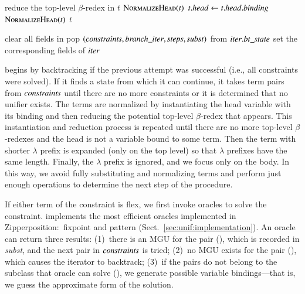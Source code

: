 \begin{algorithmic}[]
      \State reduce the top-level $\beta$-redex in $t$
      \State \Return $\textsc{NormalizeHead}(t)$
      \State $\mathit{t.head} \gets \mathit{t.head.binding}$
      \State \Return $\textsc{NormalizeHead}(t)$
    \Else{}
      \State \Return $t$
    \EndIf
  \EndFunction
  
  \vspace{\jot}
      \State clear all fields in 
      \State \Return {}
    \Else
    \State pop $(\mathit{constraints}, \mathit{branch\_iter}, \mathit{steps}, \mathit{subst})$ from $\mathit{iter.bt\_state}$
    \State set the corresponding fields of $\mathit{iter}$
    \State \Return {}
    \EndIf
  \EndFunction
  \vspace{\jot}
  
\end{algorithmic} 

 begins by backtracking if the previous attempt was successful (i.e., 
all constraints were solved). If it finds a state from which it can continue,
it takes term pairs from $\mathit{constraints}$ until
there are no more constraints or it is determined that no unifier exists. The terms
are normalized by instantiating the head variable with its binding and then
reducing the potential top-level $\beta$-redex that appears. This instantiation
and reduction process is repeated
until there are no more top-level $\beta$-redexes and the head is
not a variable bound to some term. Then the term with shorter
$\lambda$ prefix is expanded (only on the top level) so that $\lambda$ prefixes have the
same length. Finally, the $\lambda$ prefix is ignored, and we
focus only on the body. In this way, we avoid fully substituting
and normalizing terms and perform just enough operations
to determine the next step of the procedure.

If either term of the constraint is flex, we first invoke oracles to solve the
constraint. \ehohii{} implements the most efficient oracles implemented in
Zipperposition:\ fixpoint and pattern (Sect.~\ref{sec:unif:implementation}). An oracle can return three results:
(1)~there is an MGU for the pair (), which is recorded in
\emph{subst}, and the next pair in $\emph{constraints}$ is tried;
(2)~no MGU exists
for the pair (), which causes the iterator to backtrack;
(3)~if the pairs do not belong to the subclass that oracle
can solve (), we generate possible variable bindings---that is,
we guess the approximate form of the solution.

